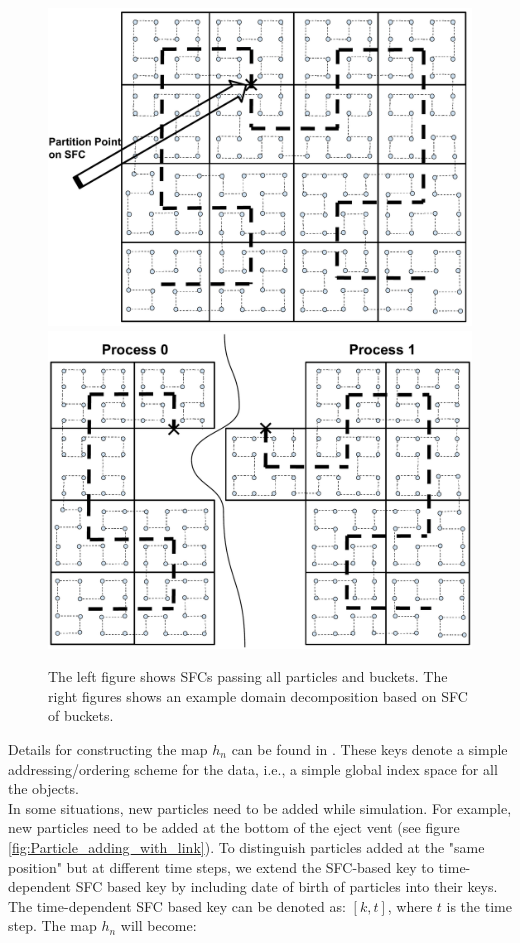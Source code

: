\documentclass[procedia]{easychair}
\begin{document}
\begin{figure}[!t]
\centering
\includegraphics[scale=0.15]{SFC_particles_buckets}
\hfil
\includegraphics[scale = 0.16]{SFC_particles_buckets_partition}
\caption{The left figure shows SFCs passing all particles and buckets. The right figures shows an example domain decomposition based on SFC of buckets.}
\label{fig:SFC_domain_decomposition}
\end{figure}
%
Details for constructing the map $h_n$ can be found in \cite{patra1995problem}. These keys denote a simple addressing/ordering scheme for the data, i.e., a simple global index space for all the objects.\\
In some situations, new particles need to be added while simulation. For example, new particles need to be added at the bottom of the eject vent (see figure \ref{fig:Particle_adding_with_link}). To distinguish particles added at the "same position" but at different time steps, we extend the SFC-based key to time-dependent SFC based key by including date of birth of particles into their keys. The time-dependent SFC based key can be denoted as: $[k,t]$, where $t$ is the time step. The map $h_n$ will become:
\end{document}
